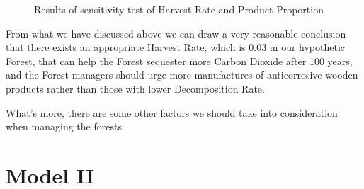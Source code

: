 \documentclass{mcmthesis}
\numberwithin{figure}{section}
\numberwithin{table}{section}
\numberwithin{equation}{section}
\begin{document}
\begin{figure}[htbp]
  \centering

\caption{Results of sensitivity test of Harvest Rate and Product Proportion}
\end{figure}

From what we have discussed above we can draw a very reasonable conclusion that 
there exists an appropriate Harvest Rate, which is 0.03 in our hypothetic Forest, 
that can help the Forest sequester more Carbon Dioxide after 100 years, and
the Forest managers should urge more manufactures of anticorrosive wooden products
rather than those with lower Decomposition Rate. 
\par
What's more, there are some other factors we should take into consideration when 
managing the forests. 


\newpage




\section{Model II}
\end{document}
